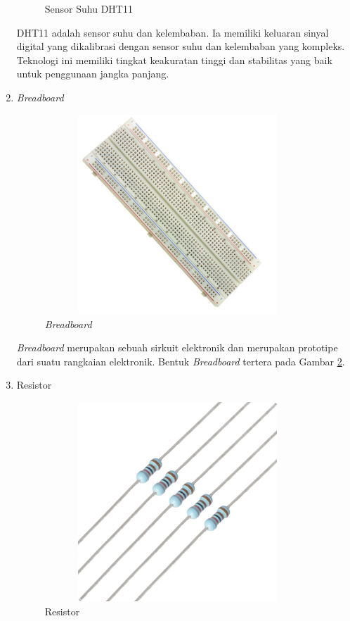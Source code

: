 \begin{enumerate}
\begin{figure}[H]
{		}
		\caption{Sensor Suhu DHT11}
		\label{figure:dth11}
	\end{figure}
	\tab DHT11 adalah sensor suhu dan kelembaban. Ia memiliki keluaran sinyal digital yang dikalibrasi dengan sensor suhu dan kelembaban yang kompleks. Teknologi ini memiliki tingkat keakuratan tinggi dan stabilitas yang baik untuk penggunaan jangka panjang.
	\pagebreak
	\item \textit{Breadboard}
	\begin{figure}[H]
		\centerline {
			\includegraphics[width=10cm,height=7.5cm]{bab5/img/breadboard.png}
		}
		\caption{\textit{Breadboard}}
		\label{figure:breadboard}
	\end{figure}
	\tab \textit{Breadboard} merupakan sebuah sirkuit elektronik dan merupakan prototipe dari suatu rangkaian elektronik. Bentuk \textit{Breadboard} tertera pada Gambar \ref{figure:breadboard}.
	\pagebreak
	\item Resistor
	\begin{figure}[H]
		\centerline {
			\includegraphics[width=10cm,height=7.5cm]{bab5/img/resistor.png}
		}
		\caption{Resistor}
		\label{figure:resistor}

\end{figure}
\end{enumerate}
